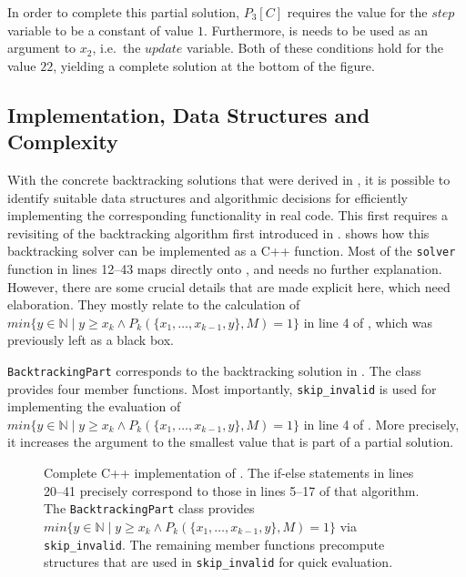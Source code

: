     In order to complete this partial solution, $P_3[C]$ requires the value for
    the $step$ variable to be a constant of value $1$.
    Furthermore, is needs to be used as an argument to $x_2$, i.e.\ the
    $update$ variable.
    Both of these conditions hold for the value $22$, yielding a complete
    solution at the bottom of the figure.

\subsection{Implementation, Data Structures and Complexity}
\label{subsec:impl}

    With the concrete backtracking solutions that were derived in
    , it is possible to
    identify suitable data structures and algorithmic decisions for efficiently
    implementing the corresponding functionality in real code.
    This first requires a revisiting of the backtracking algorithm first
    introduced in .
     shows how this backtracking solver can be implemented as
    a C++ function.
    Most of the \texttt{solver} function in lines 12--43 maps directly onto
    , and needs no further explanation.
    However, there are some crucial details that are made explicit here, which
    need elaboration.
    They mostly relate to the calculation of
    $min\{y\in\mathbb N\mid y\geq x_k\mathrel\land P_k(\{x_1,\dots,x_{k-1},y\},M)=1\}$
    in line 4 of , which was previously left as a black
    box.

    \texttt{BacktrackingPart} corresponds to the backtracking solution in
    .
    The class provides four member functions.
    Most importantly, \texttt{skip\_invalid} is used for implementing the
    evaluation of
    $min\{y\in\mathbb N\mid y\geq x_k\mathrel\land P_k(\{x_1,\dots,x_{k-1},y\},M)=1\}$
    in line 4 of .
    More precisely, it increases the argument to the smallest value that is
    part of a partial solution.

\begin{figure}[p]
    
    \caption{Complete C++ implementation of .
             The if-else statements in lines 20--41 precisely correspond
             to those in lines 5--17 of that algorithm.
             The \texttt{BacktrackingPart} class provides
             $min\{y\in\mathbb N\mid y\geq x_k\mathrel\land P_k(\{x_1,\dots,x_{k-1},y\},M)=1\}$
             via \texttt{skip\_invalid}.
             The remaining member functions precompute structures that
             are used in \texttt{skip\_invalid} for quick evaluation.}
    \label{cppsolver}
\end{figure}

